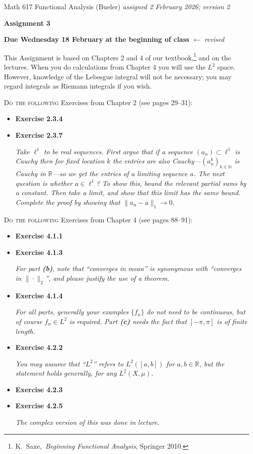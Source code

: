 \documentclass[12pt]{amsart}
\newcommand{\NN}{\mathbb{N}}
\newcommand{\RR}{\mathbb{R}}
\begin{document}
\scriptsize \noindent Math 617 Functional Analysis (Bueler) \hfill \emph{assigned 2 February 2026; {\color{red} \emph{version 2}}}
\normalsize\medskip

\Large\centerline{\textbf{Assignment 3}}
\large
\medskip

\centerline{\textbf{Due Wednesday 18 February at the beginning of class} {\color{red} $\leftarrow$ \emph{revised}}}
\medskip
\normalsize

\thispagestyle{empty}

\bigskip
\noindent This Assignment is based on Chapters 2 and 4 of our textbook,\footnote{K.~Saxe,~\emph{Beginning Functional Analysis}, Springer 2010.} and on the lectures.  When you do calculations from Chapter 4 you will use the $L^2$ space.  However, knowledge of the Lebesgue integral will not be necessary; you may regard integrals as Riemann integrals if you wish.


\newcommand{\augment}[1]{\quad\,\strut \begin{minipage}[t]{0.7\textwidth} \emph{#1}\end{minipage}}
\newcommand{\augpart}[1]{\emph{\textbf{(#1)}}}

\bigskip
\noindent \textsc{Do the following} Exercises from Chapter 2 (see pages 29--31):

\begin{itemize}
\item \textbf{Exercise 2.3.4}
\item \textbf{Exercise 2.3.7} \augment{Take $\ell^1$ to be \emph{real} sequences.  First argue that if a sequence $(a_n) \subset \ell^1$ is Cauchy then for fixed location $k$ the entries are also Cauchy---$(a_n^k)_{k\in\NN}$ is Cauchy in $\RR$---so we get the entries of a limiting sequence $a$.  The next question is whether $a\in \ell^1$?  To show this, bound the relevant partial sums by a constant.  Then take a limit, and show that this limit has the same bound.  Complete the proof by showing that $\|a_n - a\|_1\to 0$.}
\end{itemize}

\bigskip
\noindent \textsc{Do the following} Exercises from Chapter 4 (see pages 88--91):

\begin{itemize}
\item \textbf{Exercise 4.1.1}
\item \textbf{Exercise 4.1.3} \augment{For part \augpart{b}, note that ``converges in mean'' is synonymous with ``converges in $\|\cdot\|_2$'', and please justify the use of a theorem.}
\item \textbf{Exercise 4.1.4} \augment{For all parts, generally your examples $\{f_n\}$ do \emph{not} need to be continuous, but of course $f_n\in L^2$ is required.  Part \augpart{c} needs the fact that $[-\pi,\pi]$ is of finite length.}
\item \textbf{Exercise 4.2.2} \augment{You may assume that ``$L^2$'' refers to $L^2([a,b])$ for $a,b\in\RR$, but the statement holds generally, for any $L^2(X,\mu)$.}
\item \textbf{Exercise 4.2.3}
\item \textbf{Exercise 4.2.5} \augment{The complex version of this was done in lecture.}
\end{itemize}
\end{document}
